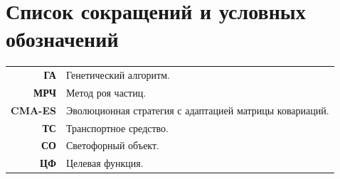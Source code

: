 \chapter*{Список сокращений и условных обозначений}             %
\noindent
\addtocounter{table}{-1}%
\begin{tabular*}{\textwidth}{rl}
\textbf{ГА} & Генетический алгоритм. \\
\textbf{МРЧ} & Метод роя частиц. \\
\textbf{CMA-ES}  & Эволюционная стратегия с адаптацией матрицы ковариаций. \\
\textbf{ТС}  & Транспортное средство. \\
\textbf{СО}  & Светофорный объект. \\
\textbf{ЦФ}  & Целевая функция. \\
%

\end{tabular*}
